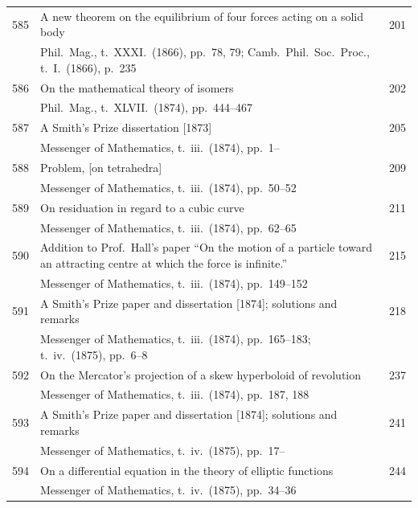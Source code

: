 \documentclass[11pt,a4paper]{book}
\begin{document}
\begin{longtable}{r @{. } p{4.8in} r}
585 & A new theorem on the equilibrium of four forces acting on a solid body & 201 \\
  & Phil.\ Mag., t.\ XXXI.\ (1866), pp.\ 78, 79; Camb.\ Phil.\ Soc.\ Proc., t.\ I.\ (1866), p.\ 235 & \\ 

586 & On the mathematical theory of isomers & 202 \\
  & Phil.\ Mag., t.\ XLVII.\ (1874), pp.\ 444--467 & \\ 

587 & A Smith's Prize dissertation [1873] & 205 \\
  & Messenger of Mathematics, t.\ iii.\ (1874), pp.\ 1-- & \\ 

588 & Problem, [on tetrahedra] & 209 \\
  & Messenger of Mathematics, t.\ iii.\ (1874), pp.\ 50--52 & \\ 

589 & On residuation in regard to a cubic curve & 211 \\
  & Messenger of Mathematics, t.\ iii.\ (1874), pp.\ 62--65 & \\ 

590 & Addition to Prof.\ Hall's paper ``On the motion of a particle toward an attracting centre at which the force is infinite.'' & 215 \\
  & Messenger of Mathematics, t.\ iii.\ (1874), pp.\ 149--152 & \\ 

591 & A Smith's Prize paper and dissertation [1874]; solutions and remarks & 218 \\
  & Messenger of Mathematics, t.\ iii.\ (1874), pp.\ 165--183; t.\ iv.\ (1875), pp.\ 6--8 & \\ 

592 & On the Mercator's projection of a skew hyperboloid of revolution & 237 \\
  & Messenger of Mathematics, t.\ iii.\ (1874), pp.\ 187, 188 & \\ 

593 & A Smith's Prize paper and dissertation [1874]; solutions and remarks & 241 \\
  & Messenger of Mathematics, t.\ iv.\ (1875), pp.\ 17-- & \\ 

594 & On a differential equation in the theory of elliptic functions & 244 \\
  & Messenger of Mathematics, t.\ iv.\ (1875), pp.\ 34--36 & \\ 


\end{longtable}
\end{document}
